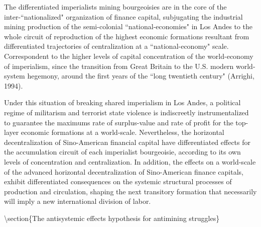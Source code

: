 \documentclass[
]{article}
\begin{document}
The differentiated imperialists mining bourgeoisies are in the core of
the inter-``nationalized" organization of finance capital, subjugating
the industrial mining production of the semi-colonial
``national-economies" in Los Andes to the whole circuit of reproduction
of the highest economic formations resultant from differentiated
trajectories of centralization at a ``national-economy" scale.
Correspondent to the higher levels of capital concentration of the
world-economy of imperialism, since the transition from Great Britain to
the U.S. modern world-system hegemony, around the first years of the
``long twentieth century" (Arrighi, 1994).

Under this situation of breaking shared imperialism in Los Andes, a
political regime of militarism and terrorist state violence is
indiscreetly instrumentalized to guarantee the maximums rate of
surplus-value and rate of profit for the top-layer economic formations
at a world-scale. Nevertheless, the horizontal decentralization of
Sino-American financial capital have differentiated effects for the
accumulation circuit of each imperialist bourgeoisie, according to its
own levels of concentration and centralization. In addition, the effects
on a world-scale of the advanced horizontal decentralization of
Sino-American finance capitals, exhibit differentiated consequences on
the systemic structural processes of production and circulation, shaping
the next transitory formation that necessarily will imply a new
international division of labor.

\textbackslash section\{The antisystemic effects hypothesis for
antimining struggles\}
\end{document}
